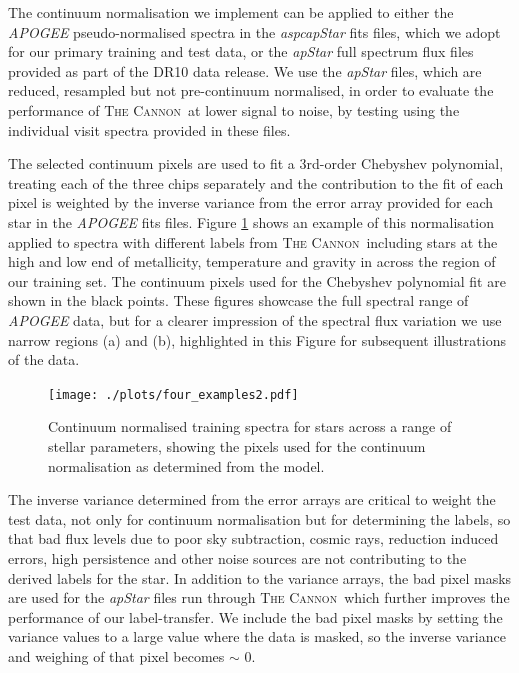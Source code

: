 \documentclass[12pt, preprint]{aastex}
\newcommand{\tc}{\textsc{The Cannon}}
\begin{document}
The continuum normalisation we implement can be applied to either the \textit{APOGEE} pseudo-normalised spectra in the \textit{aspcapStar} fits files, which we adopt for our primary training and test data, or the \textit{apStar} full spectrum flux files provided as part of the DR10 data release. We use the \textit{apStar} files, which are reduced, resampled but not pre-continuum normalised, in order to evaluate the performance of \tc\ at lower signal to noise, by testing using the individual visit spectra provided in these files.  

The selected continuum pixels are used to fit a 3rd-order Chebyshev polynomial, treating each of the three chips separately and the contribution to the fit of each pixel is weighted by the inverse variance from the error array provided for each star in the \textit{APOGEE} fits files. Figure \ref{fig:norm} shows an example of this normalisation applied to spectra with different labels from \tc\, including stars at the high and low end of metallicity, temperature and gravity in across the region of our training set. The continuum pixels used for the Chebyshev polynomial fit are shown in the black points. These figures showcase the full spectral range of \textit{APOGEE} data, but for a clearer impression of the spectral flux variation we use narrow regions (a) and (b), highlighted in this Figure for subsequent illustrations of the data. 

\begin{figure}[h!]
  \texttt{[image: ./plots/four\_examples2.pdf]}
\caption{Continuum normalised training spectra for stars across a range of stellar parameters, showing the pixels used for the continuum normalisation as determined from the model.}
\label{fig:norm}
\end{figure}


The inverse variance determined from the error arrays are critical to weight the test data, not only for continuum normalisation but for determining the labels, so that bad flux levels due to poor sky subtraction, cosmic rays, reduction induced errors, high persistence and other noise sources are not contributing to the derived labels for the star. In addition to the variance arrays, the bad pixel masks are used for the \textit{apStar} files run through \tc\, which further improves the performance of our label-transfer. We include the bad pixel masks by setting the variance values to a large value where the data is masked, so the inverse variance and weighing of that pixel becomes $\sim$ 0. 
\end{document}
